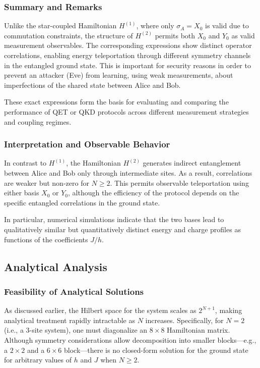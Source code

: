 \subsubsection*{Summary and Remarks}

Unlike the star-coupled Hamiltonian \( H^{(1)} \), where only \( \sigma_A = X_0 \) is valid due to commutation constraints, the structure of \( H^{(2)} \) permits both \( X_0 \) and \( Y_0 \) as valid measurement observables. The corresponding expressions show distinct operator correlations, enabling energy teleportation through different symmetry channels in the entangled ground state. This is important for security reasons in order to prevent an attacker (Eve) from learning, using weak measurements, about imperfections of the shared state between Alice and Bob.

These exact expressions form the basis for evaluating and comparing the performance of QET or QKD protocols across different measurement strategies and coupling regimes.

\subsubsection{Interpretation and Observable Behavior}

In contrast to \( H^{(1)} \), the Hamiltonian \( H^{(2)} \) generates indirect entanglement between Alice and Bob only through intermediate sites. As a result, correlations are weaker but non-zero for \( N \geq 2 \). This permits observable teleportation using either basis \( X_0 \) or \( Y_0 \), although the efficiency of the protocol depends on the specific entangled correlations in the ground state.

In particular, numerical simulations indicate that the two bases lead to qualitatively similar but quantitatively distinct energy and charge profiles as functions of the coefficients \( J/h \).

\subsection{Analytical Analysis}
\subsubsection{Feasibility of Analytical Solutions}

As discussed earlier, the Hilbert space for the system scales as \( 2^{N+1} \), making analytical treatment rapidly intractable as \( N \) increases. Specifically, for \( N = 2 \) (i.e., a 3-site system), one must diagonalize an \( 8 \times 8 \) Hamiltonian matrix. Although symmetry considerations allow decomposition into smaller blocks—e.g., a \( 2 \times 2 \) and a \( 6 \times 6 \) block—there is no closed-form solution for the ground state for arbitrary values of \( h \) and \( J \) when \( N \geq 2 \).


